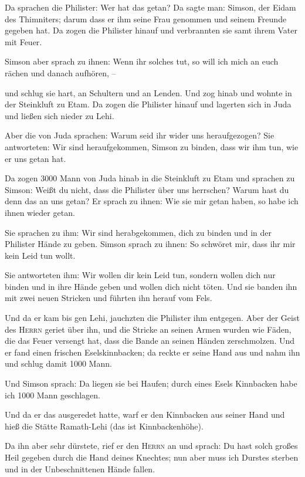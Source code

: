  Da sprachen die Philister: Wer hat das getan? Da sagte
man: Simson, der Eidam des Thimniters; darum dass er ihm seine Frau
genommen und seinem Freunde gegeben hat. Da zogen die Philister hinauf
und verbrannten sie samt ihrem Vater mit Feuer.

 Simson aber sprach zu ihnen: Wenn ihr solches tut, so
will ich mich an euch rächen und danach aufhören, --

 und schlug sie hart, an Schultern und an Lenden. Und zog
hinab und wohnte in der Steinkluft zu Etam.  Da zogen die
Philister hinauf und lagerten sich in Juda und ließen sich nieder zu
Lehi.

 Aber die von Juda sprachen: Warum seid ihr wider uns
heraufgezogen? Sie antworteten: Wir sind heraufgekommen, Simson zu
binden, dass wir ihm tun, wie er uns getan hat.

 Da zogen 3000 Mann von Juda hinab in die Steinkluft zu
Etam und sprachen zu Simson: Weißt du nicht, dass die Philister über uns
herrschen? Warum hast du denn das an uns getan? Er sprach zu ihnen: Wie
sie mir getan haben, so habe ich ihnen wieder getan.

 Sie sprachen zu ihm: Wir sind herabgekommen, dich zu
binden und in der Philister Hände zu geben. Simson sprach zu ihnen: So
schwöret mir, dass ihr mir kein Leid tun wollt.

 Sie antworteten ihm: Wir wollen dir kein Leid tun,
sondern wollen dich nur binden und in ihre Hände geben und wollen dich
nicht töten. Und sie banden ihn mit zwei neuen Stricken und führten ihn
herauf vom Fels.

 Und da er kam bis gen Lehi, jauchzten die Philister ihm
entgegen. Aber der Geist des \textsc{Herrn} geriet über ihn, und die
Stricke an seinen Armen wurden wie Fäden, die das Feuer versengt hat,
dass die Bande an seinen Händen zerschmolzen.  Und er
fand einen frischen Eselskinnbacken; da reckte er seine Hand aus und
nahm ihn und schlug damit 1000 Mann.

 Und Simson sprach: Da liegen sie bei Haufen; durch eines
Esels Kinnbacken habe ich 1000 Mann geschlagen.

 Und da er das ausgeredet hatte, warf er den Kinnbacken
aus seiner Hand und hieß die Stätte Ramath-Lehi (das ist
Kinnbackenhöhe).

 Da ihn aber sehr dürstete, rief er den \textsc{Herrn} an
und sprach: Du hast solch großes Heil gegeben durch die Hand deines
Knechtes; nun aber muss ich Durstes sterben und in der Unbeschnittenen
Hände fallen.

